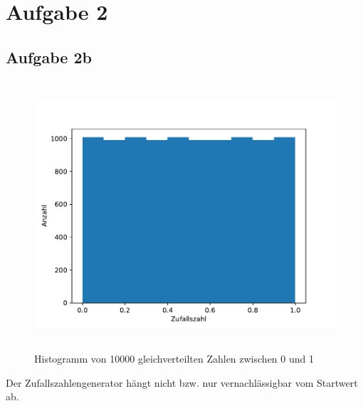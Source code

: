 \section*{Aufgabe 2}
\subsection*{Aufgabe 2b}
\begin{figure}
  \includegraphics[height=10cm]{Python/Aufgabe2b.pdf}
  \caption{Histogramm von 10000 gleichverteilten Zahlen zwischen 0 und 1}
  \label{fig:2b}
\end{figure}
Der Zufallszahlengenerator hängt nicht bzw. nur vernachlässigbar vom Startwert ab.

